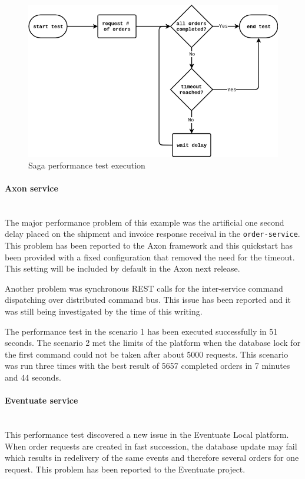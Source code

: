 \documentclass[oneside,
  digital, %
  table,   %
  lof,     %
  lot,     %
]{fithesis3}
\newcommand{\newlinepar}[1]{\paragraph{#1}\needspace{3\baselineskip}\mbox{}\\}
\begin{document}
\begin{figure}[h]
    \begin{center}
        \includegraphics[width=1.0\textwidth]{images/performance-test-flow.png}
    \end{center}
    \caption{Saga performance test execution}
    \label{fig:perf-test-flowchart}
\end{figure}


\newlinepar{Axon service}

The major performance problem of this example was the artificial one second delay placed on the shipment and invoice response receival in the \texttt{order-service}. This problem has been reported to the Axon framework and this quickstart has been provided with a fixed configuration that removed the need for the timeout. This setting will be included by default in the Axon next release. 

Another problem was synchronous REST calls for the inter-service command dispatching over distributed command bus. This issue has been reported and it was still being investigated by the time of this writing.

The performance test in the scenario 1 has been executed successfully in 51 seconds. The scenario 2 met the limits of the platform when the database lock for the first command could not be taken after about 5000 requests. This scenario was run three times with the best result of 5657 completed orders in 7 minutes and 44 seconds.

\newlinepar{Eventuate service}

This performance test discovered a new issue in the Eventuate Local platform. When order requests are created in fast succession, the database update may fail which results in redelivery of the same events and therefore several orders for one request. This problem has been reported to the Eventuate project.
\end{document}
